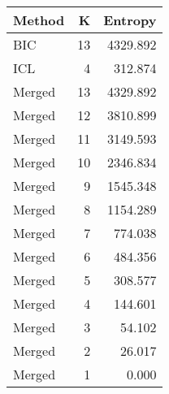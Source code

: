 \begin{center} 
\begin{tabular}{lrr}
 Method & K & Entropy \\ 
  \hline
\hline
BIC &   13 & 4329.892 \\ 
  ICL &    4 & 312.874 \\ 
  Merged &   13 & 4329.892 \\ 
  Merged &   12 & 3810.899 \\ 
  Merged &   11 & 3149.593 \\ 
  Merged &   10 & 2346.834 \\ 
  Merged &    9 & 1545.348 \\ 
  Merged &    8 & 1154.289 \\ 
  Merged &    7 & 774.038 \\ 
  Merged &    6 & 484.356 \\ 
  Merged &    5 & 308.577 \\ 
  Merged &    4 & 144.601 \\ 
  Merged &    3 & 54.102 \\ 
  Merged &    2 & 26.017 \\ 
  Merged &    1 & 0.000 \\ 
  \end{tabular}
\end{center} 
